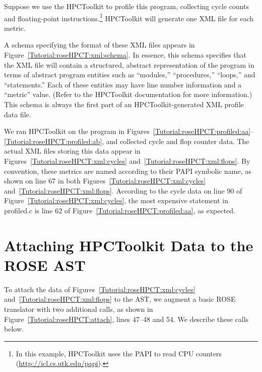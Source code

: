 Suppose we use the HPCToolkit to profile this program, collecting
cycle counts and floating-point instructions.\footnote{In this
example, HPCToolkit uses the PAPI to read CPU counters
(\url{http://icl.cs.utk.edu/papi}).} HPCToolkit will generate one XML
file for each metric.

A schema specifying the format of these XML files appears in
Figure~\ref{Tutorial:roseHPCT:xml:schema}. In essence, this schema
specifies that the XML file will contain a structured, abstract
representation of the program in terms of abstract program entities
such as ``modules,'' ``procedures,'' ``loops,'' and ``statements.''
Each of these entities may have line number information and a
``metric'' value. (Refer to the HPCToolkit documentation for more
information.) This schema is always the first part of an
HPCToolkit-generated XML profile data file.

We ran HPCToolkit on the program in
Figures~\ref{Tutorial:roseHPCT:profiled:aa}--\ref{Tutorial:roseHPCT:profiled:ab},
and collected cycle and flop counter data. The actual XML files
storing this data appear in Figures~\ref{Tutorial:roseHPCT:xml:cycles}
and~\ref{Tutorial:roseHPCT:xml:flops}. By convention, these metrics
are named according to their PAPI symbolic name, as shown on line 67
in both Figures~\ref{Tutorial:roseHPCT:xml:cycles}
and~\ref{Tutorial:roseHPCT:xml:flops}. According to the cycle data on
line 90 of Figure~\ref{Tutorial:roseHPCT:xml:cycles}, the most
expensive statement in profiled.c is line 62 of
Figure~\ref{Tutorial:roseHPCT:profiled:aa}, as expected.

\clearpage
\section{Attaching HPCToolkit Data to the ROSE AST}
\label{chap:rosehpct:attach}

To attach the data of Figures~\ref{Tutorial:roseHPCT:xml:cycles}
and~\ref{Tutorial:roseHPCT:xml:flops} to the AST, we augment a basic
ROSE translator with two additional calls, as shown in
Figure~\ref{Tutorial:roseHPCT:attach}, lines 47--48 and 54. We
describe these calls below.


